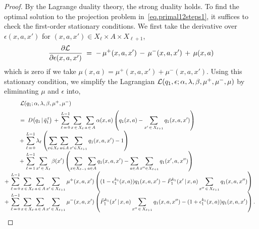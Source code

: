 \documentclass[12pt, final]{l4dc2023}
\begin{document}
\begin{proof}
	By the Lagrange duality theory, the strong duality holds. To find the optimal solution to the projection problem in~\eqref{eq.primal12steps1}, it suffices to check the first-order stationary conditions. We first take the derivative over $\epsilon(x,a,x')$ for $(x,a,x')\in X_\ell \times A\times X_{\ell+1}$,
	\[
	\frac{\partial {\mathcal{L}}}{\partial \epsilon(x,a,x') }
	\;=\; 
	-\, \mu^+(x,a,x') \,-\, \mu^-(x,a,x') \,+\, \mu(x,a)
	\]
	which is zero if we take $\mu(x,a)=\mu^+(x,a,x')+\mu^-(x,a,x')$. Using this stationary condition, we simplify the Lagrangian ${\mathcal{L}}(q_1,\epsilon; \alpha, \lambda,\beta,\mu^+,\mu^-,\mu)$ by eliminating $\mu$ and $\epsilon$ into,
	\[
	\begin{array}{rcl}
	&& \;
	\calL(q_1; \alpha, \lambda,\beta,\mu^+,\mu^-) 
	\\[0.2cm]
	&& \;=\; \displaystyle D\big(q_1\,\vert\,  \bar{q}_1^{\,t}\big) \,+\, \sum_{\ell\,=\,0}^{L-1} \sum_{x\,\in\,X_\ell}\sum_{a\,\in\, A}\alpha(x,a)\rbr{q_1(x, a) - \sum_{x'\,\in\,X_{\ell+1}} q_1(x,a,x')}
	\\[0.2cm]
	&& \displaystyle \,+\, \sum_{\ell\,=\,0}^{L-1} \lambda_\ell\rbr{\sum_{x\in X_\ell}\sum_{a\in A}\sum_{x'\in X_{\ell+1}} q_1(x, a, x') - 1}
	\\[0.2cm]
	&& \displaystyle \,+\, \sum_{\ell\,=\,1}^{L-1}\sum_{x'\,\in\,X_\ell}\beta(x') \rbr{\sum_{x\in X_{\ell-1}}\sum_{a\in A} q_1(x, a, x') -\sum_{a\in A}\sum_{x''\in X_{\ell+1}} q_1(x', a, x'')}
	\\[0.2cm]
	&& \!\!\!\! \!\!\!\! \!\!\!\! \!\!\!\! 
	\displaystyle \,+\, \sum_{\ell\,=\,0}^{L-1}\sum_{x\,\in\,X_\ell}\sum_{a\,\in\, A}\sum_{x'\,\in\,X_{\ell+1}} \mu^+(x,a,x')\rbr{ (1-\epsilon_1^{k_1}(x,a))q_1(x,a,x')-\bar P_1^{k_1}(x'\,\vert\,x,a) \sum_{x''\,\in\,X_{\ell+1}}q_1(x,a,x'') }
	\\[0.2cm]
	&& \!\!\!\! \!\!\!\! \!\!\!\! \!\!\!\! 
	\displaystyle \,+\, \sum_{\ell\,=\,0}^{L-1}\sum_{x\,\in\,X_\ell}\sum_{a\,\in\, A}\sum_{x'\,\in\,X_{\ell+1}} \mu^-(x,a,x')\rbr{\bar P_1^{k_1}(x'\,\vert\,x,a) \sum_{x''\,\in\,X_{\ell+1}}q_1(x,a,x'') -(1+\epsilon_1^{k_1}(x,a))q_1(x,a,x')}.
	\end{array}
	\]
	

\end{proof}
\end{document}
